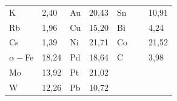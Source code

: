 \begin{table}[b!]
\begin{minipage}{.87\textwidth}
\begin{tabular}{p{1.5cm}|p{1.5cm}|p{1.5cm}|p{1.5cm}|p{1.5cm}|p{1.5cm}}

\centering

K& \centering

2,40& \centering

Au& \centering

20,43& \centering

Sn& 

~~~10,91 \\


\centering

Rb& \centering

1,96& \centering

Cu& \centering

15,20& \centering

Bi& 

~~~4,24 \\


\centering

Cs& \centering

1,39& \centering

Ni& \centering

21,71& \centering

Co& 

~~~21,52 \\


\centering

$\alpha -$Fe& \centering

18,24& \centering

Pd& \centering

18,64& \centering

C& 

~~~3,98 \\


\centering

Mo& \centering

13,92& \centering

Pt& \centering

21,02& 

& 

 \\


\centering

W& \centering

12,26& \centering

Pb& \centering

10,72& 

& 

 \\

\hline

\end{tabular}

\end{minipage}

\end{table}



